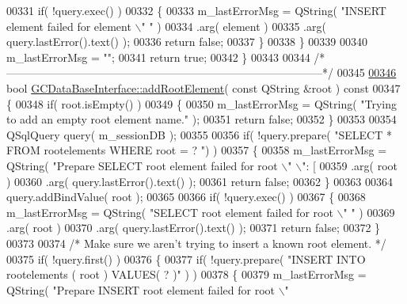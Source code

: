 \begin{DoxyCode}
{{{{{{{{{{{{{00331     \textcolor{keywordflow}{if}( !query.exec() )
00332     \{
00333       m\_lastErrorMsg = QString( \textcolor{stringliteral}{"INSERT element failed for element \(\backslash\)"%
      "} )
00334           .arg( element )
00335           .arg( query.lastError().text() );
00336       \textcolor{keywordflow}{return} \textcolor{keyword}{false};
00337     \}
00338   \}
00339 
00340   m\_lastErrorMsg = \textcolor{stringliteral}{""};
00341   \textcolor{keywordflow}{return} \textcolor{keyword}{true};
00342 \}
00343 
00344 \textcolor{comment}{/*
      --------------------------------------------------------------------------------------*/}
00345 
\hypertarget{gcdatabaseinterface_8cpp_source_l00346}{}\hyperlink{class_g_c_data_base_interface_a83ecf5fa6efc6650c834274e0e3b3aa5}{00346} \textcolor{keywordtype}{bool} \hyperlink{class_g_c_data_base_interface_a83ecf5fa6efc6650c834274e0e3b3aa5}{GCDataBaseInterface::addRootElement}( \textcolor{keyword}{const} QString &root )\textcolor{keyword}{ const}
00347 \textcolor{keyword}{}\{
00348   \textcolor{keywordflow}{if}( root.isEmpty() )
00349   \{
00350     m\_lastErrorMsg = QString( \textcolor{stringliteral}{"Trying to add an empty root element name."} );
00351     \textcolor{keywordflow}{return} \textcolor{keyword}{false};
00352   \}
00353 
00354   QSqlQuery query( m\_sessionDB );
00355 
00356   \textcolor{keywordflow}{if}( !query.prepare( \textcolor{stringliteral}{"SELECT * FROM rootelements WHERE root = ? "}) )
00357   \{
00358     m\_lastErrorMsg = QString( \textcolor{stringliteral}{"Prepare SELECT root element failed for root \(\backslash\)"%
      \(\backslash\)": [%
00359         .arg( root )
00360         .arg( query.lastError().text() );
00361     \textcolor{keywordflow}{return} \textcolor{keyword}{false};
00362   \}
00363 
00364   query.addBindValue( root );
00365 
00366   \textcolor{keywordflow}{if}( !query.exec() )
00367   \{
00368     m\_lastErrorMsg = QString( \textcolor{stringliteral}{"SELECT root element failed for root \(\backslash\)"%
      "} )
00369         .arg( root )
00370         .arg( query.lastError().text() );
00371     \textcolor{keywordflow}{return} \textcolor{keyword}{false};
00372   \}
00373 
00374   \textcolor{comment}{/* Make sure we aren't trying to insert a known root element. */}
00375   \textcolor{keywordflow}{if}( !query.first() )
00376   \{
00377     \textcolor{keywordflow}{if}( !query.prepare( \textcolor{stringliteral}{"INSERT INTO rootelements ( root ) VALUES( ? )"} ) )
00378     \{
00379       m\_lastErrorMsg = QString( \textcolor{stringliteral}{"Prepare INSERT root element failed for root \(\backslash\)"
}}}}}}}}}}}}}}}
\end{DoxyCode}
